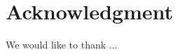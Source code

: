 \documentclass[a4paper, 10pt]{article}
\theoremstyle{definition}
\begin{document}
\section*{Acknowledgment}
We would like to thank ...
\newpage
\end{document}
